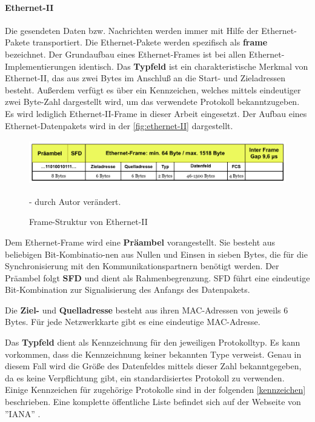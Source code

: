 \paragraph{Ethernet-II}\label{sub:ethernet-II}

Die gesendeten Daten bzw. Nachrichten werden immer mit Hilfe der Ethernet-Pakete transportiert. Die Ethernet-Pakete werden spezifisch als \textbf{frame} bezeichnet. Der Grundaufbau eines Ethernet-Frames ist bei allen Ethernet-Implementierungen identisch. Das \textbf{Typfeld} ist ein charakteristische Merkmal von Ethernet-II, das aus zwei Bytes im Anschluß an die Start- und Zieladressen besteht. Außerdem verfügt es über ein Kennzeichen, welches mittels eindeutiger zwei Byte-Zahl dargestellt wird, um das verwendete Protokoll bekanntzugeben. Es wird lediglich Ethernet-II-Frame in dieser Arbeit eingesetzt. Der Aufbau eines Ethernet-Datenpakets wird in der \autoref{fig:ethernet-II} dargestellt. 

\begin{figure}[htbp]
	\centering
		\includegraphics[width=450px,height=73px]{pictures/ethernet-II.png}
	\caption[Frame-Struktur von Ethernet-II]{Frame-Struktur von Ethernet-II \cite{netzmafia}}\label{fig:ethernet-II} - durch Autor verändert.
\end{figure}

Dem Ethernet-Frame wird eine \textbf{Präambel} vorangestellt. Sie besteht aus beliebigen Bit-Kombinatio-nen aus Nullen und Einsen in sieben Bytes, die für die Synchronisierung mit den Kommunikationspartnern benötigt werden. Der Präambel folgt \textbf{SFD} und dient als Rahmenbegrenzung. SFD führt eine eindeutige Bit-Kombination zur Signalisierung des Anfangs des Datenpakets. \smallskip \smallskip

Die \textbf{Ziel-} und \textbf{Quelladresse} besteht aus ihren MAC-Adressen von jeweils 6 Bytes. Für jede Netzwerkkarte gibt es eine eindeutige MAC-Adresse. \smallskip \smallskip

Das \textbf{Typfeld} dient als Kennzeichnung für den jeweiligen Protokolltyp. Es kann vorkommen, dass die Kennzeichnung keiner bekannten Type verweist. Genau in diesem Fall wird die Größe des Datenfeldes mittels dieser Zahl bekanntgegeben, da es keine Verpflichtung gibt, ein standardisiertes Protokoll zu verwenden. Einige Kennzeichen für zugehörige Protokolle sind in der folgenden \autoref{kennzeichen} beschrieben. Eine komplette öffentliche Liste befindet sich auf der Webseite von ''IANA'' \cite{Ethertypes}. 

